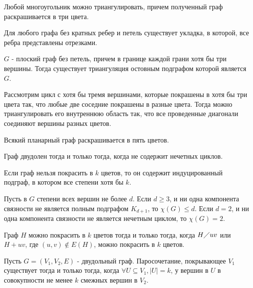 \documentclass[12pt]{article}
\begin{document}
\begin{lm}
    Любой многоугольник можно триангулировать, причем полученный граф раскрашивается в три цвета.
\end{lm}
\begin{thm}[Фари, 1948]
    Для любого графа без кратных ребер и петель существует укладка, в которой, все ребра представлены отрезками.
\end{thm}
\begin{lm}[О триангуляции]
    $G$ - плоский граф без петель, причем в границе каждой грани хотя бы три вершины. Тогда существует триангуляция остовным подграфом которой является $G$.
\end{lm}
\begin{st}
    Рассмотрим цикл с хотя бы тремя вершинами, которые покрашены в хотя бы три цвета так, что любые две соседние покрашены в разные цвета. Тогда можно триангулировать его внутреннюю область так, что все проведенные диагонали соединяют вершины разных цветов.
\end{st}
\begin{thm}[Хивуд]
    Всякий планарный граф раскрашивается в пять цветов.
\end{thm}
\begin{thm}
    Граф двудолен тогда и только тогда, когда не содержит нечетных циклов.
\end{thm}
\begin{lm}
    Если граф нельзя покрасить в $k$ цветов, то он содержит индуцированный подграф, в котором все степени хотя бы $k$.
\end{lm}
\begin{thm}[Брукс, 1941]
    Пусть в $G$ степени всех вершин не более $d $. Если $d \ge 3$, и ни одна компонента связности не является полным подграфом $K_{d+1}$, то $\chi(G) \le d$. Если $d = 2$, и ни одна компонента связности не является нечетным циклом, то $\chi(G) = 2$.
\end{thm}
\begin{st}
    Граф $H$ можно покрасить в $k$ цветов тогда и только тогда, когда $H\diagup uv$ или $H + uv$, где $(u, v) \notin E(H)$, можно покрасить в $k$ цветов.
\end{st}
\begin{thm}
    Пусть $G = (V_1, V_2,E)$ - двудольный граф. Паросочетание, покрывающее $V_1$ существует тогда и только тогда, когда $\forall U \subseteq V_1, |U| = k$, у вершин в $U$ в совокупности не менее $k $ смежных вершин в $V_2$.
\end{thm}
\end{document}
